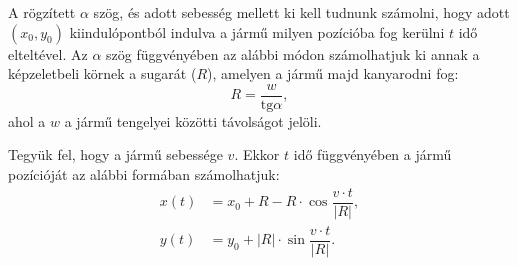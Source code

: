 \documentclass[a4paper]{paper}
\begin{document}
A rögzített $\alpha$ szög, és adott sebesség mellett ki kell tudnunk számolni, hogy adott $(x_0, y_0)$ kiindulópontból indulva a jármű milyen pozícióba fog kerülni $t$ idő elteltével. Az $\alpha$ szög függvényében az alábbi módon számolhatjuk ki annak a képzeletbeli körnek a sugarát ($R$), amelyen a jármű majd kanyarodni fog:
\[
R = \dfrac{w}{\text{tg} \alpha},
\]
ahol a $w$ a jármű tengelyei közötti távolságot jelöli.

Tegyük fel, hogy a jármű sebessége $v$. Ekkor $t$ idő függvényében a jármű pozícióját az alábbi formában számolhatjuk:
\begin{align*}
x(t) &= x_0 + R - R \cdot \cos \dfrac{v \cdot t}{|R|}, \\
y(t) &= y_0 + |R| \cdot \sin \dfrac{v \cdot t}{|R|}.
\end{align*}
\end{document}
